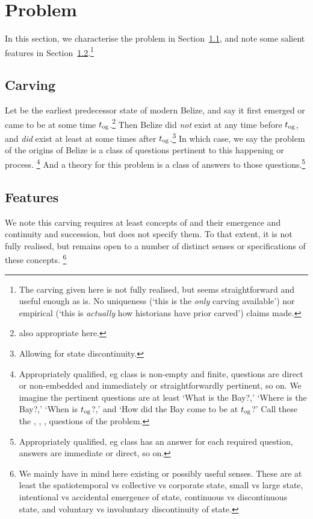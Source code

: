 \section{Problem}
\label{s:problem}
	In this section, we characterise the problem in Section~\ref{ss:carving}, and note some salient features in Section~\ref{ss:features}.\footnote{The carving given here is not fully realised, but seems straightforward and useful enough as is. No uniqueness (`this is the \emph{only} carving available') nor empirical (`this is \emph{actually} how historians have prior carved') claims made.}
	\subsection{Carving}
	\label{ss:carving}
		Let  be the earliest predecessor state of modern Belize, and say it first emerged or came to be at some time \(t_{\operatorname{og}}\).\footnote{ also appropriate here.} Then Belize did \emph{not} exist at any time before \(t_{\operatorname{og}}\), and \emph{did} exist at least at some times after \(t_{\operatorname{og}}\).\footnote{Allowing for state discontinuity.} In which case, we say the problem of the origins of Belize is a class of questions pertinent to this happening or process.%
		\footnote{Appropriately qualified, eg class is non-empty and finite, questions are direct or non-embedded and immediately or straightforwardly pertinent, so on. We imagine the pertinent questions are at least `What is the Bay?,' `Where is the Bay?,' `When is \(t_{\operatorname{og}}\)?,' and `How did the Bay come to be at \(t_{\operatorname{og}}\)?' Call these the , , ,  questions of the problem.}
		And a theory for this problem is a class of answers to those questions.\footnote{Appropriately qualified, eg class has an answer for each required question, answers are immediate or direct, so on.}
	\subsection{Features}
	\label{ss:features}
		We note this carving requires at least concepts of  and their emergence and continuity and succession, but does not specify them. To that extent, it is not fully realised, but remains open to a number of distinct senses or specifications of these concepts.%
		\footnote{We mainly have in mind here existing or possibly useful senses. These are at least the spatiotemporal vs collective vs corporate state, small vs large state, intentional vs accidental emergence of state, continuous vs discontinuous state, and voluntary vs involuntary discontinuity of state.}
	

